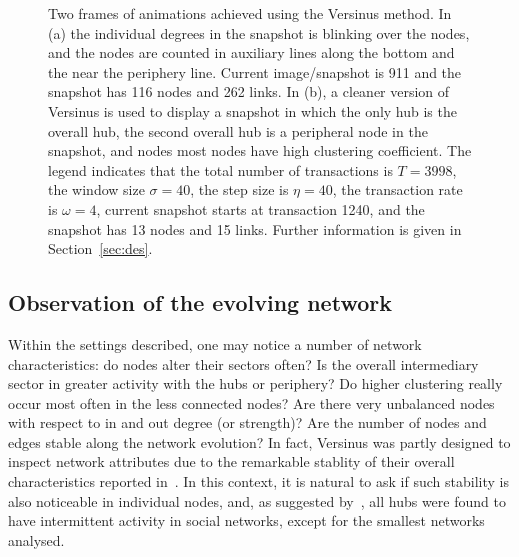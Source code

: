\documentclass[runningheads]{llncs}
\begin{document}
\begin{figure}[!h]\centering
    \qquad
    \caption{Two frames of animations achieved using the Versinus method. In (a) the individual degrees in the snapshot is blinking over the nodes, and the nodes are counted in auxiliary lines along the bottom and the near the periphery line. Current image/snapshot is 911 and the snapshot has 116 nodes and 262 links.
   In (b), a cleaner version of Versinus is used to display a snapshot in which the only hub is the overall hub, the second overall hub is a peripheral node in the snapshot, and nodes most nodes have high clustering coefficient. The legend indicates that the total number of transactions is $T=3998$, the window size $\sigma=40$, the step size is $\eta=40$, the transaction rate is $\omega=4$, current snapshot starts at transaction 1240, and the snapshot has 13 nodes and 15 links.
   Further information is given in Section~\ref{sec:des}.
   }%
    \label{fig:final}%
\end{figure}

\subsection{Observation of the evolving network}
Within the settings described, one may notice a number of network characteristics: do nodes alter their sectors often? Is the overall intermediary sector in greater activity with the hubs or periphery?
Do higher clustering really occur most often in the less connected nodes?
Are there very unbalanced nodes with respect to in and out degree (or strength)?
Are the number of nodes and edges stable along the network evolution?
In fact, Versinus was partly designed to inspect network attributes due to the remarkable stablity of their overall characteristics reported in~\cite{stab}.
In this context, it is natural to ask if such stability is also noticeable in individual nodes, and, 
as suggested by~\cite{barabasiEvo}, all hubs were found to have intermittent activity in social networks, except for the smallest networks analysed.
\end{document}
